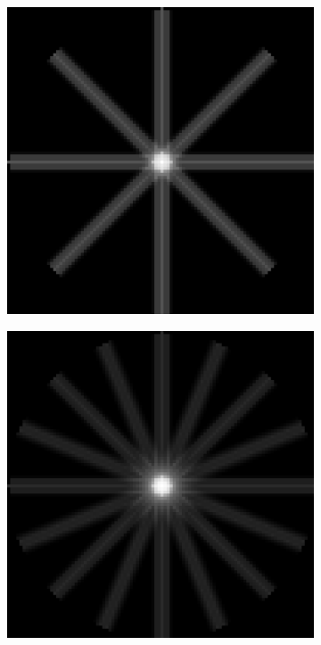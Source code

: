 \documentclass[letterpaper,12pt]{article}
\theoremstyle{plain}
\begin{document}
\begin{figure}[H]
   \centering
       \begin{subfigure}[h]{0.24\textwidth}
           \centering
           \includegraphics[width=\textwidth]{Figuras/retroproyeccion_p=8_filter=none.png} 
       \end{subfigure}
       \begin{subfigure}[h]{0.24\textwidth}
           \centering
           \includegraphics[width=\textwidth]{Figuras/retroproyeccion_p=16_filter=none.png}

\end{subfigure}
\end{figure}
\end{document}
